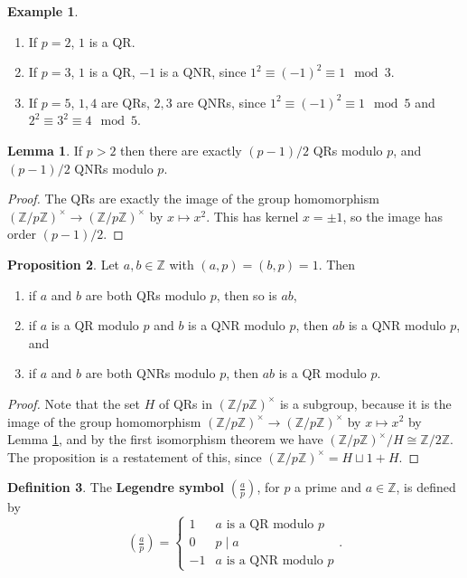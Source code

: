 \documentclass{article}
\newcommand{\Z}{\mathbb{Z}}
\newcommand{\rb}[1]{\left( #1 \right)}
\newcommand{\unit}[1]{\rb{\Z / #1\Z}^\times}
\newcommand{\legendre}[2]{\rb{\tfrac{#1}{#2}}}
\theoremstyle{definition}\newtheorem{definition}{Definition}
\theoremstyle{definition}\newtheorem{remark}[definition]{Remark}
\theoremstyle{definition}\newtheorem*{example}{Example}
\theoremstyle{definition}\newtheorem*{note}{Note}
\newtheorem{proposition}[definition]{Proposition}
\newtheorem{lemma}[definition]{Lemma}
\begin{document}
\begin{example}
\hfill
\begin{enumerate}
\item If $ p = 2 $, $ 1 $ is a QR.
\item If $ p = 3 $, $ 1 $ is a QR, $ -1 $ is a QNR, since $ 1^2 \equiv \rb{-1}^2 \equiv 1 \mod 3 $.
\item If $ p = 5 $, $ 1, 4 $ are QRs, $ 2, 3 $ are QNRs, since $ 1^2 \equiv \rb{-1}^2 \equiv 1 \mod 5 $ and $ 2^2 \equiv 3^2 \equiv 4 \mod 5 $.
\end{enumerate}
\end{example}

\begin{lemma}
\label{lem:34}
If $ p > 2 $ then there are exactly $ \rb{p - 1} / 2 $ QRs modulo $ p $, and $ \rb{p - 1} / 2 $ QNRs modulo $ p $.
\end{lemma}

\begin{proof}
The QRs are exactly the image of the group homomorphism $ \unit{p} \to \unit{p} $ by $ x \mapsto x^2 $. This has kernel $ x = \pm 1 $, so the image has order $ \rb{p - 1} / 2 $.
\end{proof}

\begin{proposition}
\label{prop:35}
Let $ a, b \in \Z $ with $ \rb{a, p} = \rb{b, p} = 1 $. Then
\begin{enumerate}
\item if $ a $ and $ b $ are both QRs modulo $ p $, then so is $ ab $,
\item if $ a $ is a QR modulo $ p $ and $ b $ is a QNR modulo $ p $, then $ ab $ is a QNR modulo $ p $, and
\item if $ a $ and $ b $ are both QNRs modulo $ p $, then $ ab $ is a QR modulo $ p $.
\end{enumerate}
\end{proposition}

\begin{proof}
Note that the set $ H $ of QRs in $ \unit{p} $ is a subgroup, because it is the image of the group homomorphism $ \unit{p} \to \unit{p} $ by $ x \mapsto x^2 $ by Lemma \ref{lem:34}, and by the first isomorphism theorem we have $ \unit{p} / H \cong \Z / 2\Z $. The proposition is a restatement of this, since $ \unit{p} = H \sqcup 1 + H $.
\end{proof}

\begin{definition}
The \textbf{Legendre symbol} $ \legendre{a}{p} $, for $ p $ a prime and $ a \in \Z $, is defined by
$$ \legendre{a}{p} = \begin{cases} 1 & a \text{ is a QR modulo } p \\ 0 & p \mid a \\ -1 & a \text{ is a QNR modulo } p \end{cases}. $$
\end{definition}
\end{document}
